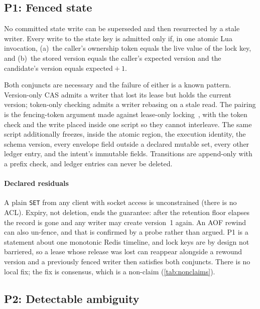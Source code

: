 \subsection{P1: Fenced state}
\label{sec:p1}

\begin{property}
No committed state write can be superseded and then resurrected by a stale
writer. Every write to the state key is admitted only if, in one atomic Lua
invocation, (a)~the caller's ownership token equals the live value of the lock
key, and (b)~the stored version equals the caller's expected version and the
candidate's version equals expected${}+1$.
\end{property}

Both conjuncts are necessary and the failure of either is a known
pattern. Version-only CAS admits a writer that lost its lease but holds the
current version; token-only checking admits a writer rebasing on a stale
read. The pairing is the fencing-token argument made against lease-only
locking~\cite{kleppmann2016locking}, with the token check and the write placed
inside one script so they cannot interleave. The same script additionally
freezes, inside the atomic region, the execution identity, the schema version,
every envelope field outside a declared mutable set, every other ledger entry,
and the intent's immutable fields. Transitions are append-only with a prefix
check, and ledger entries can never be deleted.

\paragraph{Declared residuals} A plain \texttt{SET} from any client with socket
access is unconstrained (there is no ACL). Expiry, not deletion, ends the
guarantee: after the retention floor elapses the record is gone and any writer
may create version~1 again. An AOF rewind can also un-fence, and that is
confirmed by a probe rather than argued. P1 is a statement about one monotonic
Redis timeline, and lock keys are by design not barriered, so a lease
whose release was lost can reappear alongside a rewound version and a
previously fenced writer then satisfies both conjuncts. There is no local fix;
the fix is consensus, which is a non-claim (\cref{tab:nonclaims}).

\subsection{P2: Detectable ambiguity}
\label{sec:p2}

